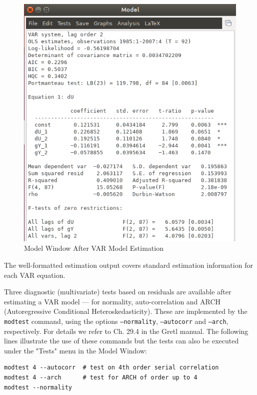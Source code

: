 \documentclass[11pt]{article}
\begin{document}
\begin{figure}[!h]
	\centering
	\includegraphics[width=.42\textwidth]{../figures/gui_var}
	\caption{Model Window After VAR Model Estimation}
	\label{fig:gui_model}
\end{figure}

The well-formatted estimation output covers standard estimation information for each VAR equation.

Three diagnostic (multivariate) tests based on residuals are available after estimating a VAR model --- for normality, auto-correlation and ARCH (Autoregressive Conditional Heteroskedasticity). These are implemented by the \texttt{modtest} command, using the options \texttt{---normality}, \texttt{---autocorr} and \texttt{---arch}, respectively. For details we refer to Ch. 29.4 in the Gretl manual. The following lines illustrate the use of these commands but the tests can also be executed under the "Tests" menu in the Model Window:
\begin{Verbatim}[baselinestretch=0.75, fontsize=\small]
modtest 4 --autocorr  # test on 4th order serial correlation
modtest 4 --arch      # test for ARCH of order up to 4
modtest --normality
\end{Verbatim}
\end{document}
